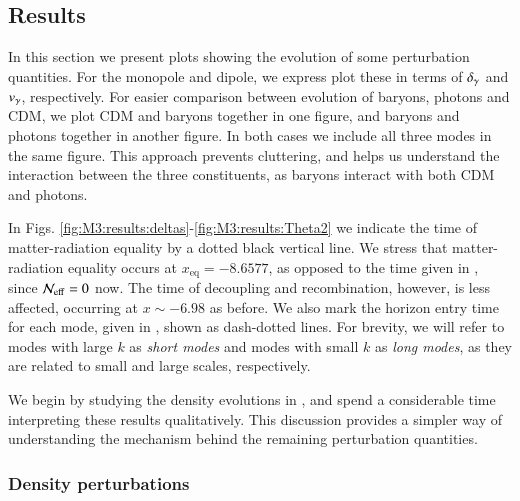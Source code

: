 \subsection{Results}\label{ssec:M3:results}

In this section we present plots showing the evolution of some perturbation quantities. For the monopole and dipole, we express plot these in terms of $\delta_\gamma$ and $v_\gamma$, respectively. For easier comparison between evolution of baryons, photons and CDM, we plot CDM and baryons together in one figure, and baryons and photons together in another figure. In both cases we include all three modes in the same figure. This approach prevents cluttering, and helps us understand the interaction between the three constituents, as baryons interact with both CDM and photons. 

In Figs. \ref{fig:M3:results:deltas}-\ref{fig:M3:results:Theta2} we indicate the time of matter-radiation equality by a dotted black vertical line. We stress that matter-radiation equality occurs at $x_\mathrm{eq}=-8.6577$, as opposed to the time given in , since $\mathcal{N}_\mathrm{eff}=0$ now. The time of decoupling and recombination, however, is less affected, occurring at $x\sim-6.98$ as before. We also mark the horizon entry time for each mode, given in , shown as dash-dotted lines. For brevity, we will refer to modes with large $k$ as \textit{short modes} and modes with small $k$ as \textit{long modes}, as they are related to small and large scales, respectively. 

We begin by studying the density evolutions in , and spend a considerable time interpreting these results qualitatively. This discussion provides a simpler way of understanding the mechanism behind the remaining perturbation quantities.

\subsubsection{Density perturbations} \label{sssec:M3:results:density_perturbations}

